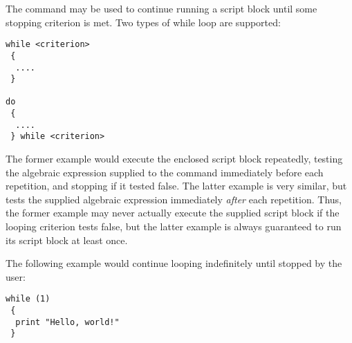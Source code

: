 The  command may be used to continue running a script block
until some stopping criterion is met. Two types of while loop are supported:

\begin{verbatim}
while <criterion>
 {
  ....
 }

do
 {
  ....
 } while <criterion>
\end{verbatim}

The former example would execute the enclosed script block repeatedly, testing
the algebraic expression supplied to the  command immediately
before each repetition, and stopping if it tested false. The latter example is
very similar, but tests the supplied algebraic expression immediately {\it
after} each repetition. Thus, the former example may never actually execute the
supplied script block if the looping criterion tests false, but the latter
example is always guaranteed to run its script block at least once.

The following example would continue looping indefinitely until stopped by the
user:

\begin{verbatim}
while (1)
 {
  print "Hello, world!"
 }
\end{verbatim}


